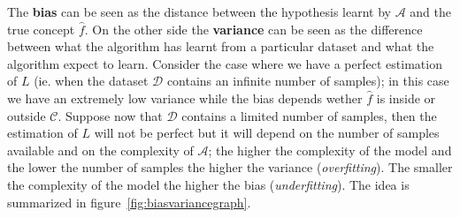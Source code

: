       	\noindent The \textbf{bias} can be seen as the distance between the hypothesis learnt by $\mathcal{A}$ and the true concept $\hat{f}$. On the
      	other side the \textbf{variance} can be seen as the difference between what the algorithm has learnt from a particular
      	dataset and what the algorithm expect to learn.\newline
      	Consider the case where we have a perfect estimation of $L$ (ie. when the dataset $\mathcal{D}$ contains an infinite number of samples);
      	in this case we have an extremely low variance while the bias depends wether $\hat{f}$ is inside or outside $\mathcal{C}$.\newline
      	Suppose now that $\mathcal{D}$ contains a limited number of samples, then the estimation of $L$ will not be perfect but it will depend on
      	the number of samples available and on the complexity of $\mathcal{A}$; the higher the complexity of the model and the lower the number of samples
      	the higher the variance (\textit{overfitting}). The smaller the complexity of the model the higher the bias (\textit{underfitting}). The idea is
      	summarized in figure~\ref{fig:biasvariancegraph}.

